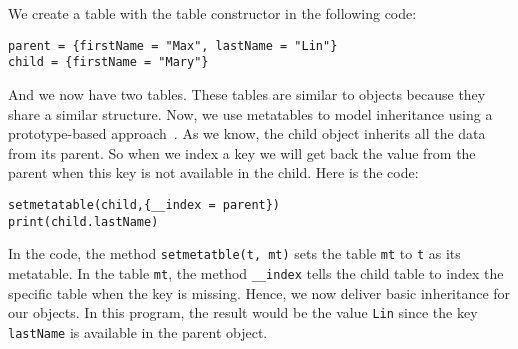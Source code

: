 We create a table with the table constructor in the following code:
\begin{flushleft}
\tt parent = \{firstName = "Max", lastName = "Lin"\} \\
\tt child = \{firstName = "Mary"\} \\
\end{flushleft}
And we now have two tables. These tables are similar to objects because they share a similar structure. Now, we use metatables to model inheritance using a prototype-based approach~\cite{PIJS}. As we know, the child object inherits all the data from its parent. So when we index a key we will get back the value from the parent when this key is not available in the child. Here is the code:
\begin{flushleft}
\tt setmetatable(child,\{\_\_index = parent\}) \\
\tt print(child.lastName)\\
\end{flushleft}

In the code, the method {\tt setmetatble(t, mt)} sets the table {\tt mt} to {\tt t} as its metatable. In the table {\tt mt}, the method {\tt \_\_index} tells the child table to index the specific table when the key is missing. Hence, we now deliver basic inheritance for our objects. In this program, the result would be the value {\tt Lin} since the key {\tt lastName} is available in the parent object.
